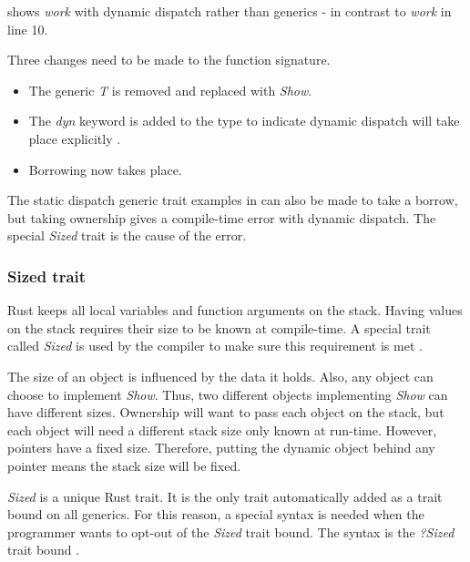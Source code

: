  shows \textit{work} with dynamic dispatch rather than generics - in contrast to \textit{work} in  line 10.


Three changes need to be made to the function signature.
\begin{itemize}
	\item The generic \textit{T} is removed and replaced with \textit{Show}.
	\item The \textit{dyn} keyword is added to the type to indicate dynamic dispatch will take place explicitly \cite{klabnik_2019_01}.
	\item Borrowing now takes place.
\end{itemize}

The static dispatch generic trait examples in  can also be made to take a borrow, but taking ownership gives a compile-time error with dynamic dispatch.
The special \textit{Sized} trait is the cause of the error.

\subsubsection{Sized trait}
Rust keeps all local variables and function arguments on the stack.
Having values on the stack requires their size to be known at compile-time.
A special trait called \textit{Sized} is used by the compiler to make sure this requirement is met \cite{klabnik_2019_01}.

The size of an object is influenced by the data it holds.
Also, any object can choose to implement \textit{Show}.
Thus, two different objects implementing \textit{Show} can have different sizes.
Ownership will want to pass each object on the stack, but each object will need a different stack size only known at run-time.
However, pointers have a fixed size.
Therefore, putting the dynamic object behind any pointer means the stack size will be fixed.

\begin{notebox}
	\textit{Sized} is a unique Rust trait.
	It is the only trait automatically added as a trait bound on all generics.
	For this reason, a special syntax is needed when the programmer wants to opt-out of the \textit{Sized} trait bound.
	The syntax is the \textit{?Sized} trait bound \cite{klabnik_2019_01}.
\end{notebox}

